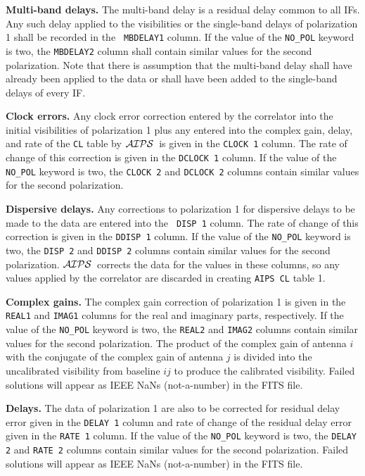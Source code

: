 \documentclass[twoside]{article}
\newcommand{\AIPS}{{$\cal AIPS\/$}}
\begin{document}
{\bf Multi-band delays.} The multi-band delay is a residual delay
common to all IFs.  Any such delay applied to the visibilities or the
single-band delays of polarization 1 shall be recorded in the {\tt
MBDELAY1} column.  If the value of the {\tt NO\_POL} keyword is two,
the {\tt MBDELAY2} column shall contain similar values for the second
polarization.  Note that there is assumption that the multi-band delay
shall have already been applied to the data or shall have been added
to the single-band delays of every IF\@.

{\bf Clock errors.} Any clock error correction entered by the
correlator into the initial visibilities of polarization 1 plus any
entered into the complex gain, delay, and rate of the {\tt CL} table
by \AIPS\ is given in the {\tt CLOCK 1} column.  The rate of change of
this correction is given in the {\tt DCLOCK 1} column.  If the value
of the {\tt NO\_POL} keyword is two, the {\tt CLOCK 2} and {\tt DCLOCK
  2} columns contain similar values for the second polarization.

{\bf Dispersive delays.}  Any corrections to polarization 1 for
dispersive delays to be made to the data are entered into the {\tt
  DISP 1} column.  The rate of change of this correction is given in
the {\tt DDISP 1} column.  If the value of the {\tt NO\_POL} keyword
is two, the {\tt DISP 2} and {\tt DDISP 2} columns contain similar
values for the second polarization.  \AIPS\ corrects the data for the
values in these columns, so any values applied by the correlator are
discarded in creating {\tt AIPS CL} table 1.

{\bf Complex gains.} The complex gain correction of polarization 1 is
given in the {\tt REAL1} and {\tt IMAG1} columns for the real and
imaginary parts, respectively.  If the value of the {\tt NO\_POL}
keyword is two, the {\tt REAL2} and {\tt IMAG2} columns contain
similar values for the second polarization.  The product of the
complex gain of antenna $i$ with the conjugate of the complex gain of
antenna $j$ is divided into the uncalibrated visibility from baseline
$ij$ to produce the calibrated visibility.  Failed solutions will
appear as IEEE NaNs (not-a-number) in the FITS file.

{\bf Delays.} The data of polarization 1 are also to be corrected for
residual delay error given in the {\tt DELAY 1} column and rate of
change of the residual delay error given in the {\tt RATE 1} column.
If the value of the {\tt NO\_POL} keyword is two, the {\tt DELAY 2}
and {\tt RATE 2} columns contain similar values for the second
polarization.  Failed solutions will appear as IEEE NaNs
(not-a-number) in the FITS file.
\end{document}
